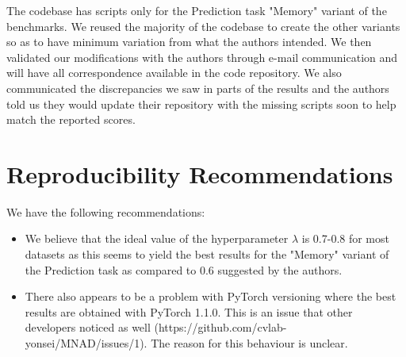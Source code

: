 The codebase has scripts only for the Prediction task "Memory" variant of the benchmarks. We reused the majority of the codebase to create the other variants so as to have minimum variation from what the authors intended. We then validated our modifications with the authors through e-mail communication and will have all correspondence available in the code repository. We also communicated the discrepancies we saw in parts of the results and the authors told us they would update their repository with the missing scripts soon to help match the reported scores.

\section{Reproducibility Recommendations}

We have the following recommendations: 
\begin{itemize}
    \item We believe that the ideal value of the hyperparameter $\lambda$ is 0.7-0.8 for most datasets as this seems to yield the best results for the "Memory" variant of the Prediction task as compared to 0.6 suggested by the authors.
    \item There also appears to be a problem with PyTorch versioning where the best results are obtained with PyTorch 1.1.0. This is an issue that other developers noticed as well (https://github.com/cvlab-yonsei/MNAD/issues/1). The reason for this behaviour is unclear.
\end{itemize}

